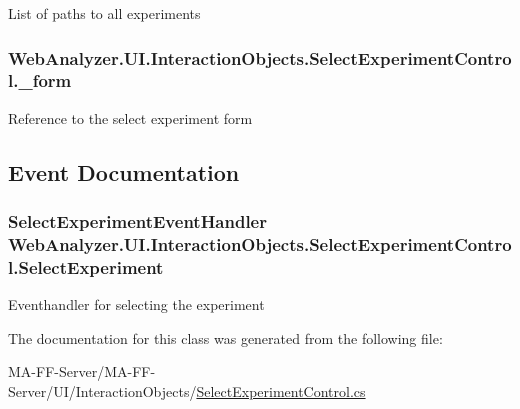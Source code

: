 List of paths to all experiments 

\hypertarget{class_web_analyzer_1_1_u_i_1_1_interaction_objects_1_1_select_experiment_control_ac6586d336cac091bf139064cf7a72a13}{}
\subsubsection[{\+\_\+form}]{ Web\+Analyzer.\+U\+I.\+Interaction\+Objects.\+Select\+Experiment\+Control.\+\_\+form\hspace{0.3cm}{\ttfamily [private]}}\label{class_web_analyzer_1_1_u_i_1_1_interaction_objects_1_1_select_experiment_control_ac6586d336cac091bf139064cf7a72a13}


Reference to the select experiment form 



\subsection{Event Documentation}
\hypertarget{class_web_analyzer_1_1_u_i_1_1_interaction_objects_1_1_select_experiment_control_a7062e7537081a90d11a7c26cefe79651}{}
\subsubsection[{Select\+Experiment}]{\setlength{\rightskip}{0pt plus 5cm}Select\+Experiment\+Event\+Handler Web\+Analyzer.\+U\+I.\+Interaction\+Objects.\+Select\+Experiment\+Control.\+Select\+Experiment}\label{class_web_analyzer_1_1_u_i_1_1_interaction_objects_1_1_select_experiment_control_a7062e7537081a90d11a7c26cefe79651}


Eventhandler for selecting the experiment 



The documentation for this class was generated from the following file\+:\begin{DoxyCompactItemize}
\item 
M\+A-\/\+F\+F-\/\+Server/\+M\+A-\/\+F\+F-\/\+Server/\+U\+I/\+Interaction\+Objects/\hyperlink{_select_experiment_control_8cs}{Select\+Experiment\+Control.\+cs}\end{DoxyCompactItemize}
